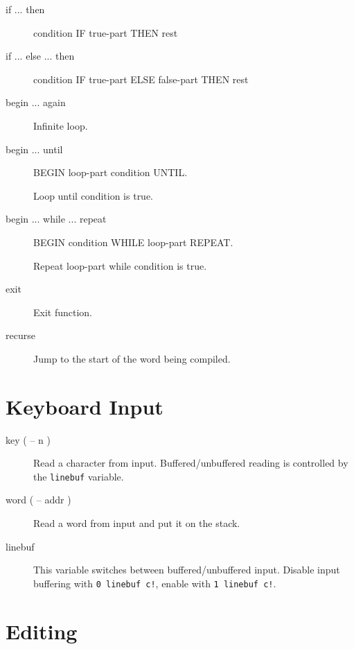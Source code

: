 \begin{description}
\item[if ... then]

condition IF true-part THEN rest

\item[if ... else ... then]

condition IF true-part ELSE false-part THEN rest

\item[begin ... again]

Infinite loop.

\item[begin ... until]

BEGIN loop-part condition UNTIL.

Loop until condition is true.

\item[begin ... while ... repeat]

BEGIN condition WHILE loop-part REPEAT.

Repeat loop-part while condition is true.

\item[exit]

Exit function.

\item[recurse] Jump to the start of the word being compiled.

\end{description}

\section{Keyboard Input}

\begin{description}
\item[key ( -- n )]

Read a character from input. Buffered/unbuffered reading is controlled by the \texttt{linebuf} variable.

\item[word ( -- addr )] Read a word from input and put it on the stack.

\item[linebuf]

This variable switches between buffered/unbuffered input. Disable input buffering with \texttt{0 linebuf c!}, enable with \texttt{1 linebuf c!}.

\end{description}

\section{Editing}

